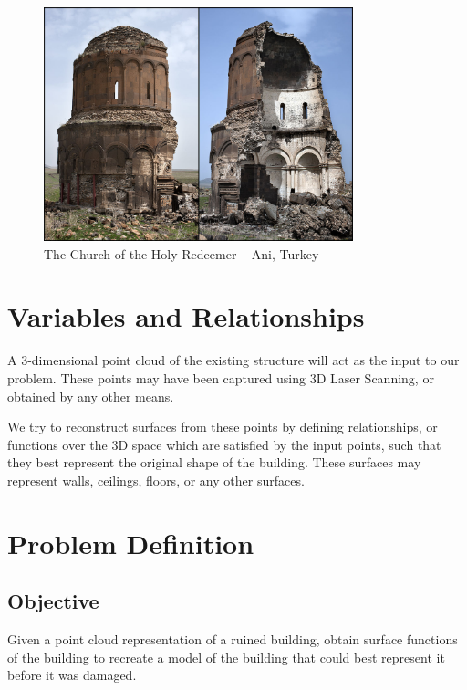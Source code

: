 \documentclass[12pt,a4paper]{article}
\begin{document}
    \begin{figure}
        \centering
        \captionsetup{justification=centering}
        
        \includegraphics[width=0.8\textwidth]{ruins.jpg}
        
        \caption{The Church of the Holy Redeemer -- Ani, Turkey}
        \label{fig:ruins}
    \end{figure}
    
    \section{Variables and Relationships}
    
    A 3-dimensional point cloud of the existing structure will act as the input to our problem. These points may have been captured using 3D Laser Scanning, or obtained by any other means.
    
    We try to reconstruct surfaces from these points by defining relationships, or functions over the 3D space which are satisfied by the input points, such that they best represent the original shape of the building. These surfaces may represent walls, ceilings, floors, or any other surfaces.
    
    \section{Problem Definition}
    
    \subsection{Objective}
    
    Given a point cloud representation of a ruined building, obtain surface functions of the building to recreate a model of the building that could best represent it before it was damaged.
    
\end{document}
